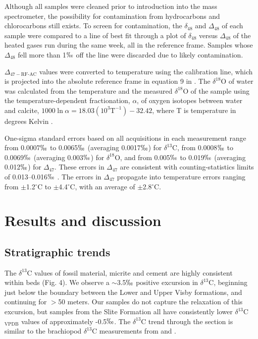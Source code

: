 \documentclass[preprint, authoryear]{elsarticle}
\begin{document}
Although all samples were cleaned prior to introduction into the mass spectrometer, the possibility for contamination from hydrocarbons and chlorocarbons still exists. To screen for contamination, the $\delta_{48}$ and $\Delta_{48}$ of each sample were compared to a line of best fit through a plot of $\delta_{48}$ versus $\Delta_{48}$ of the heated gases run during the same week, all in the \cite{Ghosh2006} reference frame. Samples whose $\Delta_{48}$ fell more than 1$\permil$ off the line were discarded due to likely contamination. 

$\Delta_{47-\text{RF-AC}}$ values were converted to temperature using the \cite{Ghosh2006} calibration line, which is projected into the absolute reference frame in equation 9 in \cite{Dennis2011}. The $\delta^{18}$O of water was calculated from the temperature and the measured $\delta^{18}$O of the sample using the temperature-dependent fractionation, $\alpha$, of oxygen isotopes between water and calcite, $1000\ln\alpha=18.03(10^3\text{T}^{-1})-32.42$, where T is temperature in degrees Kelvin \citep{Kim1997}. 

One-sigma standard errors based on all acquisitions in each measurement range from 0.0007$\permil$ to 0.0065$\permil$ (averaging 0.0017$\permil$) for $\delta^{13}$C, from 0.0008$\permil$ to 0.0069$\permil$ (averaging 0.003$\permil$) for $\delta^{18}$O, and from 0.005$\permil$ to 0.019$\permil$ (averaging 0.012$\permil$) for $\Delta_{47}$. These errors in $\Delta_{47}$ are consistent with counting-statistics limits of 0.013--0.016$\permil$ \citep{Huntington2009}. The errors in $\Delta_{47}$ propagate into temperature errors ranging from $\pm$1.2$^{\circ}$C to $\pm$4.4$^{\circ}$C, with an average of $\pm$2.8$^{\circ}$C. 

\section{Results and discussion}

\subsection{Stratigraphic trends}

The $\delta^{13}$C values of fossil material, micrite and cement are highly consistent within beds (Fig. 4). We observe a $\sim$3.5$\permil$ positive excursion in $\delta^{13}$C, beginning just below the boundary between the Lower and Upper Visby formations, and continuing for $>$50 meters. Our samples do not capture the relaxation of this excursion, but samples from the Slite Formation all have consistently lower $\delta^{13}$C$_{\text{VPDB}}$ values of approximately -0.5$\permil$. The $\delta^{13}$C trend through the section is similar to the brachiopod $\delta^{13}$C measurements from \cite{Bickert1997} and \cite{Munnecke2003}. 
\end{document}
